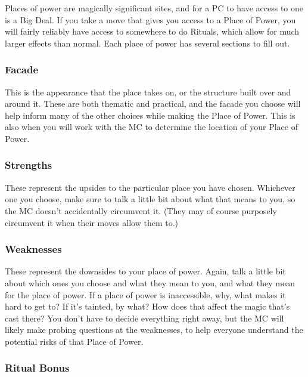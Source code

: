 \documentclass[10pt,twoside,openright]{memoir}
\begin{document}
Places of power are magically significant sites, and for a PC to have
access to one is a Big Deal. If you take a move that gives you access to
a Place of Power, you will fairly reliably have access to somewhere to
do Rituals, which allow for much larger effects than normal. Each place
of power has several sections to fill out.

\hypertarget{facade}{%
\subsubsection{Facade}\label{facade}}

This is the appearance that the place takes on, or the structure built
over and around it. These are both thematic and practical, and the
facade you choose will help inform many of the other choices while
making the Place of Power. This is also when you will work with the MC
to determine the location of your Place of Power.

\hypertarget{strengths}{%
\subsubsection{Strengths}\label{strengths}}

These represent the upsides to the particular place you have chosen.
Whichever one you choose, make sure to talk a little bit about what that
means to you, so the MC doesn't accidentally circumvent it. (They may of
course purposely circumvent it when their moves allow them to.)

\hypertarget{weaknesses}{%
\subsubsection{Weaknesses}\label{weaknesses}}

These represent the downsides to your place of power. Again, talk a
little bit about which ones you choose and what they mean to you, and
what they mean for the place of power. If a place of power is
inaccessible, why, what makes it hard to get to? If it's tainted, by
what? How does that affect the magic that's cast there? You don't have
to decide everything right away, but the MC will likely make probing
questions at the weaknesses, to help everyone understand the potential
risks of that Place of Power.

\hypertarget{ritual-bonus}{%
\subsubsection{Ritual Bonus}\label{ritual-bonus}}
\end{document}
